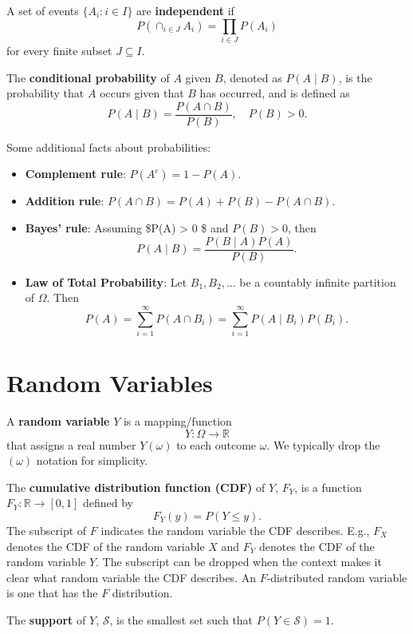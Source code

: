 \documentclass[
]{book}
\providecommand{\tightlist}{%
  \setlength{\itemsep}{0pt}\setlength{\parskip}{0pt}}
\theoremstyle{definition}
\theoremstyle{definition}
\theoremstyle{definition}
\theoremstyle{definition}
\theoremstyle{remark}
\begin{document}
A set of events \(\{A_i:i\in I\}\) are \textbf{independent} if
\[
P\left(\cap_{i\in J} A_i \right)=\prod_{i\in J} P(A_i )
\]
for every finite subset \(J\subseteq I\).

The \textbf{conditional probability} of \(A\) given \(B\), denoted as \(P(A\mid B)\), is the probability that \(A\) occurs given that \(B\) has occurred, and is defined as
\[
P(A\mid B) = \frac{P(A\cap B)}{P(B)}, \quad P(B) > 0.
\]

Some additional facts about probabilities:

\begin{itemize}
\tightlist
\item
  \textbf{Complement rule}: \(P(A^c) = 1 - P(A)\).
\item
  \textbf{Addition rule}: \(P(A\cap B) = P(A) + P(B) - P(A \cap B)\).
\item
  \textbf{Bayes' rule}: Assuming \$P(A) \textgreater{} 0 \$ and \(P(B) > 0\), then
  \[P(A\mid B) = \frac{P(B\mid A)P(A)}{P(B)}.\]
\item
  \textbf{Law of Total Probability}: Let \(B_1, B_2, \ldots\) be a countably infinite partition of \(\Omega\). Then
  \[P(A) = \sum_{i=1}^{\infty} P(A \cap B_i) = \sum_{i=1}^{\infty} P(A \mid B_i) P(B_i).\]
\end{itemize}

\hypertarget{random-variables}{%
\section{Random Variables}\label{random-variables}}

A \textbf{random variable} \(Y\) is a mapping/function
\[
Y:\Omega\to\mathbb{R}
\]
that assigns a real number \(Y(\omega)\) to each outcome \(\omega\). We typically drop the \((\omega)\) notation for simplicity.

The \textbf{cumulative distribution function (CDF)} of \(Y\), \(F_Y\), is a function \(F_Y:\mathbb{R}\to [0,1]\) defined by
\[
F_Y (y)=P(Y \leq y).
\]
The subscript of \(F\) indicates the random variable the CDF describes. E.g., \(F_X\) denotes the CDF of the random variable \(X\) and \(F_Y\) denotes the CDF of the random variable \(Y\). The subscript can be dropped when the context makes it clear what random variable the CDF describes. An \(F\)-distributed random variable is one that has the \(F\) distribution.

The \textbf{support} of \(Y\), \(\mathcal{S}\), is the smallest set such that \(P(Y\in \mathcal{S})=1\).
\end{document}
